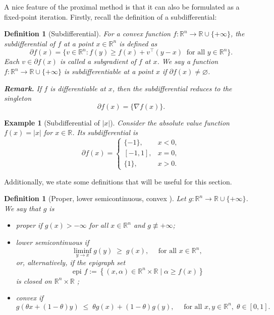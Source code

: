 \documentclass[11pt, twoside]{report}
\newtheorem{definition}[theorem]{Definition}
\newtheorem{example}[theorem]{Example}
\begin{document}
A nice feature of the proximal method is that it can also be formulated as a fixed-point iteration. Firstly, recall the definition of a subdifferential:
\begin{definition}[Subdifferential]
For a convex function $f : \mathbb{R}^n \to \mathbb{R} \cup \{+\infty\}$, the \emph{subdifferential} of $f$ at a point $x \in \mathbb{R}^n$ is defined as
\[
\partial f(x) = \bigl\{ v \in \mathbb{R}^n : f(y) \geq f(x) + v^\top (y - x) \;\; \text{for all } y \in \mathbb{R}^n \bigr\}.
\]
Each $v \in \partial f(x)$ is called a subgradient of $f$ at $x$. We say a function $f : \mathbb{R}^n \to \mathbb{R} \cup \{+\infty\}$ is subdifferentiable at a point $x$ if $\partial f(x) \neq \varnothing$.
\medskip

\noindent
\textbf{Remark.} If $f$ is differentiable at $x$, then the subdifferential reduces to the singleton
\[
\partial f(x) = \{ \nabla f(x) \}.
\]
\end{definition}
\begin{example}[Subdifferential of $|x|$]
Consider the absolute value function $f(x) = |x| $ for $x \in \mathbb{R} $. Its subdifferential is
\[
\partial f(x) =
\begin{cases}
\{-1\}, & x < 0, \\[6pt]
[-1,1], & x = 0, \\[6pt]
\{1\}, & x > 0.
\end{cases}
\]
\end{example}
Additionally, we state some definitions that will be useful for this section.
\begin{definition}[Proper, lower semicontinuous, convex \cite{rockafellar1998variational}]
Let \(g : \mathbb{R}^n \to \mathbb{R} \cup \{+\infty\}\).  
We say that \(g\) is
\begin{itemize}
    \item \emph{proper} if \(g(x) > -\infty\) for all \(x \in \mathbb{R}^n\) and \(g \not\equiv +\infty\);
    \item \emph{lower semicontinuous} if
    \[
        \liminf_{y \to x} g(y) \;\geq\; g(x), \quad \text{ for all } x \in \mathbb{R}^n,
    \]
    or, alternatively, if the epigraph set
    $$
        \text { epi } f:=\left\{(x, \alpha) \in \mathbb{R}^n \times \mathbb{R} \mid \alpha \geq f(x)\right\}
    $$
    is closed on $\mathbb{R}^n \times \mathbb{R}$ \cite[Theorem 1.6]{rockafellar1998variational};
    \item \emph{convex} if
    \[
        g(\theta x + (1-\theta) y) \;\leq\; \theta g(x) + (1-\theta) g(y),
        \quad \text{ for all } x,y \in \mathbb{R}^n,\; \theta \in [0,1].
    \]
\end{itemize}
\end{definition}
\end{document}
